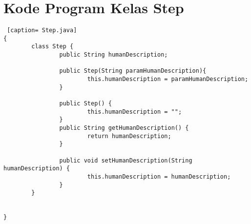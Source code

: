 \chapter{Kode Program Kelas Step}
\label{Kode Program Kelas Step}

\begin{lstlisting} [caption= Step.java]
{ 
		class Step {
				public String humanDescription;

				public Step(String paramHumanDescription){
						this.humanDescription = paramHumanDescription;
				}

				public Step() {
						this.humanDescription = "";
				}
				public String getHumanDescription() {
						return humanDescription;
				}

				public void setHumanDescription(String humanDescription) {
						this.humanDescription = humanDescription;
				}
		}

		
}
\end{lstlisting}